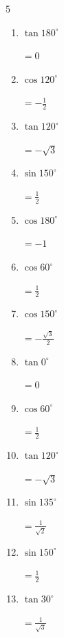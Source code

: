 \begin{multicols}{5}
\begin{enumerate}
  \item $\displaystyle \tan{180^\circ}$

        $\displaystyle =0$

  \item $\displaystyle \cos{120^\circ}$

        $\displaystyle =-\frac{1}{2}$

  \item $\displaystyle \tan{120^\circ}$

        $\displaystyle =-\sqrt{3}$

  \item $\displaystyle \sin{150^\circ}$

        $\displaystyle =\frac{1}{2}$

\columnbreak %

  \item $\displaystyle \cos{180^\circ}$

        $\displaystyle =-1$

  \item $\displaystyle \cos{60^\circ}$

        $\displaystyle =\frac{1}{2}$

  \item $\displaystyle \cos{150^\circ}$

        $\displaystyle =-\frac{\sqrt{3}}{2}$

  \item $\displaystyle \tan{0^\circ}$

        $\displaystyle =0$

  \item $\displaystyle \cos{60^\circ}$

        $\displaystyle =\frac{1}{2}$

  \item $\displaystyle \tan{120^\circ}$

        $\displaystyle =-\sqrt{3}$

  \item $\displaystyle \sin{135^\circ}$

        $\displaystyle =\frac{1}{\sqrt{2}}$

  \item $\displaystyle \sin{150^\circ}$

        $\displaystyle =\frac{1}{2}$

  \item $\displaystyle \tan{30^\circ}$

        $\displaystyle =\frac{1}{\sqrt{3}}$


\end{enumerate}
\end{multicols}
